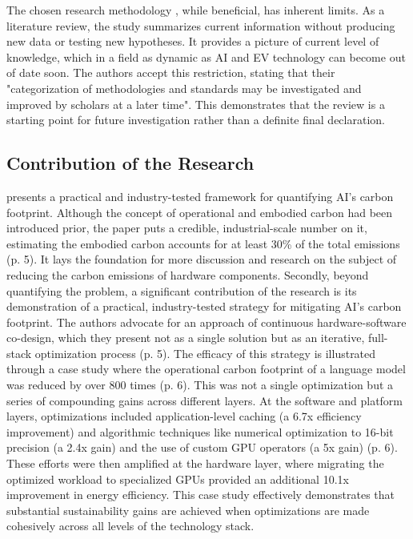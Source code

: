\documentclass[a4paper, 12pt]{article}
\begin{document}
The chosen research methodology \citet{M.rauf2024}, while beneficial, has inherent limits.  As a literature review, the study summarizes current information without producing new data or testing new hypotheses.  It provides a picture of current level of knowledge, which in a field as dynamic as AI and EV technology can become out of date soon.  The authors accept this restriction, stating that their "categorization of methodologies and standards may be investigated and improved by scholars at a later time".  This demonstrates that the review is a starting point for future investigation rather than a definite final declaration.

\subsection{Contribution of the Research}
\citet{Wu2022} presents a practical and industry-tested framework for quantifying AI's carbon footprint. Although the concept of operational and embodied carbon had been introduced prior, the paper puts a credible, industrial-scale number on it, estimating the embodied carbon accounts for at least 30\% of the total emissions (p. 5). It lays the foundation for more discussion and research on the subject of reducing the carbon emissions of hardware components. Secondly, beyond quantifying the problem, a significant contribution of the research is its demonstration of a practical, industry-tested strategy for mitigating AI's carbon footprint. The authors advocate for an approach of continuous hardware-software co-design, which they present not as a single solution but as an iterative, full-stack optimization process (p. 5). The efficacy of this strategy is illustrated through a case study where the operational carbon footprint of a language model was reduced by over 800 times (p. 6). This was not a single optimization but a series of compounding gains across different layers. At the software and platform layers, optimizations included application-level caching (a 6.7x efficiency improvement) and algorithmic techniques like numerical optimization to 16-bit precision (a 2.4x gain) and the use of custom GPU operators (a 5x gain) (p. 6). These efforts were then amplified at the hardware layer, where migrating the optimized workload to specialized GPUs provided an additional 10.1x improvement in energy efficiency. This case study effectively demonstrates that substantial sustainability gains are achieved when optimizations are made cohesively across all levels of the technology stack.\hfill \break
\end{document}
